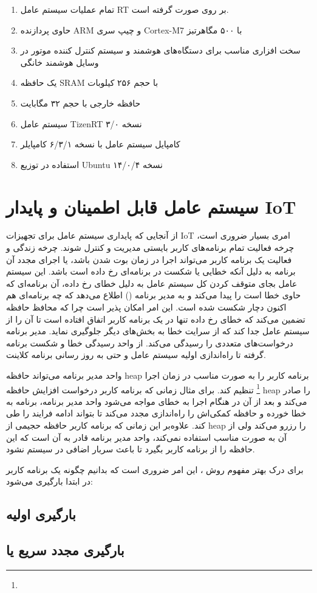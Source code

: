 \documentclass[10pt, a4paper]{article}
\begin{document}
\begin{enumerate}
    \item تمام عملیات سیستم عامل RT بر روی 
    \cite{armnxpimxrt1020} صورت گرفته است.
    \item حاوی پردازنده ARM و چیپ سری Cortex-M7 با ۵۰۰ مگاهرتبز
    \item سخت افزاری مناسب برای دستگاه‌های هوشمند و سیستم کنترل کننده موتور در
    وسایل هوشمند خانگی
    \item یک حافظه SRAM با حجم ۲۵۶ کیلوبات
    \item حافظه خارجی با حجم ۳۲ مگابایت 
    \item سیستم عامل TizenRT نسخه ۳/۰ \cite{tizenrtrepo}
    \item کامپایل سیستم عامل با نسخه ۶/۳/۱ کامپایلر 
    \item استفاده در توزیع Ubuntu نسخه ۱۴/۰/۴
\end{enumerate}

\section{سیستم عامل قابل اطمینان و پایدار IoT}

از آنجایی که پایداری سیستم عامل برای تجهیزات IoT امری بسیار ضروری است، چرخه
فعالیت تمام برنامه‌های کاربر بایستی مدیریت و کنترل شوند. چرخه زندگی و فعالیت یک
برنامه کاربر می‌تواند اجرا در زمان بوت شدن باشد، یا اجرای مجدد آن برنامه به دلیل
آنکه خطایی یا شکست در برنامه‌ای رخ داده است باشد. این سیستم عامل بجای متوقف کردن
کل سیستم عامل به دلیل خطای رخ داده، آن برنامه‌ای که حاوی خطا است را پیدا می‌کند
و به مدیر برنامه () اطلاع می‌دهد که چه برنامه‌ای هم اکنون
دچار شکست شده است. این امر امکان پذیر است چرا که محافظ حافظه تضمین می‌کند که
خطای رخ داده تنها در یک برنامه کاربر اتفاق افتاده است تا آن را از سیستم عامل جدا
کند که از سرایت خطا به بخش‌های دیگر جلوگیری نماید. مدیر برنامه درخواست‌های
متعددی را رسیدگی می‌کند. از واحد رسیدگی خطا و شکست برنامه گرفته تا را‌ه‌اندازی
اولیه سیستم عامل و حتی به روز رسانی برنامه کلاینت.

واحد مدیر برنامه می‌تواند حافظه heap برنامه کاربر را به صورت مناسب در زمان اجرا
\footnote{} تنظیم کند. برای مثال زمانی که برنامه کاربر درخواست
افزایش حافظه heap را صادر می‌کند و بعد از آن در هنگام اجرا به خطای 
مواجه می‌شود واحد مدیر برنامه، برنامه به خطا خورده و حافظه کمکی‌اش را راه‌اندازی
مجدد می‌کند تا بتواند ادامه فرایند را طی کند. علاوه‌بر این زمانی که برنامه کاربر
حافظه حجیمی از heap را رزرو می‌کند ولی از آن به صورت مناسب استفاده نمی‌کند، واحد
مدیر برنامه قادر به آن است که این حافظه را از برنامه کاربر بگیرد تا باعث سربار
اضافی در سیستم نشود.


برای درک بهتر مفهوم روش ، این امر ضروری است که بدانیم چگونه
یک برنامه کاربر در ابتدا بارگیری می‌شود:

\subsection{بارگیری اولیه}

\subsection{بارگیری مجدد سریع یا }




\end{document}
